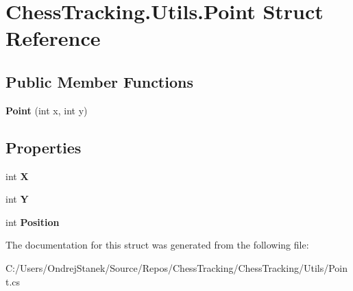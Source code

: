 \hypertarget{struct_chess_tracking_1_1_utils_1_1_point}{}\section{Chess\+Tracking.\+Utils.\+Point Struct Reference}
\label{struct_chess_tracking_1_1_utils_1_1_point}
\subsection*{Public Member Functions}
\begin{DoxyCompactItemize}
\item 
\mbox{\label{struct_chess_tracking_1_1_utils_1_1_point_a687a9f3fff6b65bf4dd95d52daa3e35f}} 
{\bfseries Point} (int x, int y)
\end{DoxyCompactItemize}
\subsection*{Properties}
\begin{DoxyCompactItemize}
\item 
\mbox{\label{struct_chess_tracking_1_1_utils_1_1_point_a18a597b6fab10ea67ce96b8417a8e225}} 
int {\bfseries X}
\item 
\mbox{\label{struct_chess_tracking_1_1_utils_1_1_point_a16dd60c9dbf7b8c8bb4c128f828caa08}} 
int {\bfseries Y}
\item 
\mbox{\label{struct_chess_tracking_1_1_utils_1_1_point_a173f506766b4d8995f3e0afff4b618ea}} 
int {\bfseries Position}
\end{DoxyCompactItemize}


The documentation for this struct was generated from the following file\+:\begin{DoxyCompactItemize}
\item 
C\+:/\+Users/\+Ondrej\+Stanek/\+Source/\+Repos/\+Chess\+Tracking/\+Chess\+Tracking/\+Utils/Point.\+cs\end{DoxyCompactItemize}
